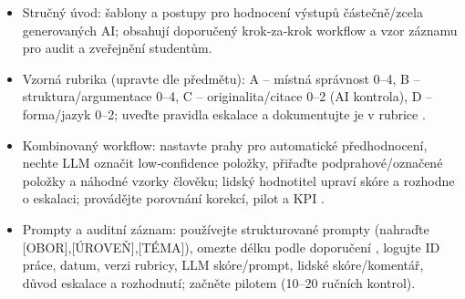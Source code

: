 \begin{itemize}
\item Stručný úvod: šablony a postupy pro hodnocení výstupů částečně/zcela generovaných AI; obsahují doporučený krok‑za‑krok workflow a vzor záznamu pro audit a zveřejnění studentům.
\item Vzorná rubrika (upravte dle předmětu): A – místná správnost 0–4, B – struktura/argumentace 0–4, C – originalita/citace 0–2 (AI kontrola), D – forma/jazyk 0–2; uveďte pravidla eskalace a dokumentujte je v rubrice \cite{2-6}.
\item Kombinovaný workflow: nastavte prahy pro automatické předhodnocení, nechte LLM označit low‑confidence položky, přiřaďte podprahové/označené položky a náhodné vzorky člověku; lidský hodnotitel upraví skóre a rozhodne o eskalaci; provádějte porovnání korekcí, pilot a KPI \cite{2-6}.
\item Prompty a auditní záznam: používejte strukturované prompty (nahraďte [OBOR],[ÚROVEŇ],[TÉMA]), omezte délku podle doporučení \cite{3-2}, logujte ID práce, datum, verzi rubricy, LLM skóre/prompt, lidské skóre/komentář, důvod eskalace a rozhodnutí; začněte pilotem (10–20 ručních kontrol).
\end{itemize}
